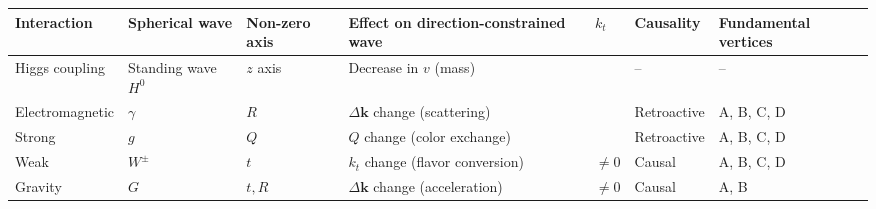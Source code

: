 \documentclass[
  a4paper,11pt]{article}
\newcounter{none}
\theoremstyle{definition}
\theoremstyle{remark}
\begin{document}
{\def\LTcaptype{none} %
\begin{longtable}[]{@{}
  >{\raggedright\arraybackslash}p{}
  >{\raggedright\arraybackslash}p{}
  >{\raggedright\arraybackslash}p{}
  >{\raggedright\arraybackslash}p{}
  >{\raggedright\arraybackslash}p{}
  >{\raggedright\arraybackslash}p{}
  >{\raggedright\arraybackslash}p{}@{}}
\toprule\noalign{}
\begin{minipage}[b]{\linewidth}\raggedright
Interaction
\end{minipage} & \begin{minipage}[b]{\linewidth}\raggedright
Spherical wave
\end{minipage} & \begin{minipage}[b]{\linewidth}\raggedright
Non-zero axis
\end{minipage} & \begin{minipage}[b]{\linewidth}\raggedright
Effect on direction-constrained wave
\end{minipage} & \begin{minipage}[b]{\linewidth}\raggedright
\(k_t\)
\end{minipage} & \begin{minipage}[b]{\linewidth}\raggedright
Causality
\end{minipage} & \begin{minipage}[b]{\linewidth}\raggedright
Fundamental vertices
\end{minipage} \\
\midrule\noalign{}
\endhead
\bottomrule\noalign{}
\endlastfoot
Higgs coupling & Standing wave \(H^0\) & \(z\) axis & Decrease in \(v\)
(mass) & 0 & -- & -- \\
Electromagnetic & \(\gamma\) & \(R\) & \(\Delta\mathbf{k}\) change
(scattering) & 0 & Retroactive & A, B, C, D \\
Strong & \(g\) & \(Q\) & \(Q\) change (color exchange) & 0 & Retroactive
& A, B, C, D \\
Weak & \(W^{\pm}\) & \(t\) & \(k_t\) change (flavor conversion) &
\(\neq 0\) & Causal & A, B, C, D \\
Gravity & \(G\) & \(t, R\) & \(\Delta\mathbf{k}\) change (acceleration)
& \(\neq 0\) & Causal & A, B \\
\end{longtable}
}
\end{document}

